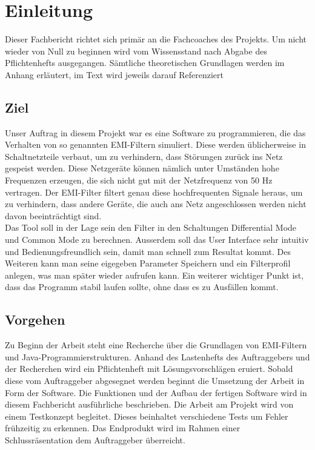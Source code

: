 \section{Einleitung} \label{sec:einleitung}
Dieser Fachbericht richtet sich primär an die Fachcoaches des Projekts. Um nicht wieder von Null zu beginnen wird vom Wissensstand nach Abgabe des Pflichtenhefts ausgegangen. Sämtliche theoretischen Grundlagen werden im Anhang erläutert, im Text wird jeweils darauf Referenziert

\subsection{Ziel} \label{subsec:ziel}
Unser Auftrag in diesem Projekt war es eine Software zu programmieren, die das Verhalten von so genannten EMI-Filtern simuliert. Diese werden üblicherweise in Schaltnetzteile verbaut, um zu verhindern, dass Störungen zurück ins Netz gespeist werden. Diese Netzgeräte können nämlich unter Umständen hohe Frequenzen erzeugen, die sich nicht gut mit der Netzfrequenz von 50 Hz vertragen. Der EMI-Filter filtert genau diese hochfrequenten Signale heraus, um zu verhindern, dass andere  Geräte, die auch ans Netz angeschlossen werden nicht davon beeinträchtigt sind.\\
Das Tool soll in der Lage sein den Filter in den Schaltungen Differential Mode und Common Mode zu berechnen. Ausserdem soll das User Interface sehr intuitiv und Bedienungsfreundlich sein, damit man schnell zum Resultat kommt. Des Weiteren kann man seine eigegeben Parameter Speichern und ein Filterprofil anlegen, was man später wieder aufrufen kann. Ein weiterer wichtiger Punkt ist, dass das Programm stabil laufen sollte, ohne dass es zu Ausfällen kommt.
\subsection{Vorgehen} \label{subsec:vorgehen}
Zu Beginn der Arbeit steht eine Recherche über die Grundlagen von EMI-Filtern und Java-Programmierstrukturen. Anhand des Lastenhefts des Auftraggebers und der Recherchen wird ein Pflichtenheft mit Lösungsvorschlägen eruiert. Sobald diese vom Auftraggeber abgesegnet werden beginnt die Umsetzung der Arbeit in Form der Software. Die Funktionen und der Aufbau der fertigen Software wird in diesem Fachbericht ausführliche beschrieben. Die Arbeit am Projekt wird von einem Testkonzept begleitet. Dieses beinhaltet verschiedene Tests um Fehler frühzeitig zu erkennen. Das Endprodukt wird im Rahmen einer Schlussräsentation dem Auftraggeber überreicht.

